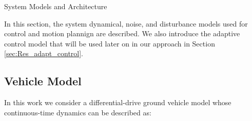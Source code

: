 \begin{section}{System Models and Architecture}
	
\label{sec:modeling}
In this section, the system dynamical, noise, and disturbance models used for control and motion plannign are described. We also introduce the adaptive control model that will be used later on in our approach in Section \ref{sec:Res_adapt_control}.


\subsection{Vehicle Model}
In this work we consider a differential-drive ground vehicle model \cite{nutaro2011building} whose continuous-time dynamics can be described as:


\end{section}
